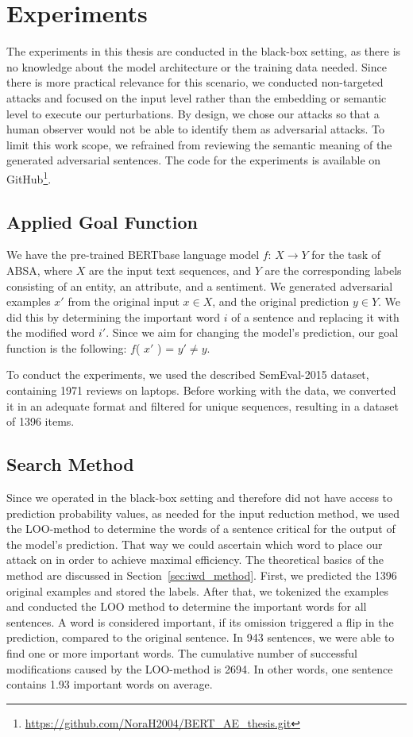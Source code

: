 \section{Experiments}
\label{sec:experiments}

The experiments in this thesis are conducted in the black-box setting, as there is no knowledge about the model architecture or the training data needed. Since there is more practical relevance for this scenario, we conducted non-targeted attacks and focused on the input level rather than the embedding or semantic level to execute our perturbations. By design, we chose our attacks so that a human observer would not be able to identify them as adversarial attacks. 
To limit this work scope, we refrained from reviewing the semantic meaning of the generated adversarial sentences. The code for the experiments is available on GitHub\footnote{\url{https://github.com/NoraH2004/BERT_AE_thesis.git}}.

\subsection{Applied Goal Function}
 \label{sec:goal_function_m}
We have the pre-trained BERTbase language model $f$: ${X \rightarrow Y}$ for the task of ABSA, where $X$ are the input text sequences, and $Y$ are the corresponding labels consisting of an entity, an attribute, and a sentiment. We generated adversarial examples ${x'}$ from the original input $x \in X$, and the original prediction $y \in Y$. We did this by determining the important word $i$ of a sentence and replacing it with the modified word $i'$. Since we aim for changing the model's prediction, our goal function is the following: 
$f$( $x'$ ) = $y' \neq y$.

To conduct the experiments, we used the described SemEval-2015 dataset, containing 1971 reviews on laptops. Before working with the data, we converted it in an adequate format and filtered for unique sequences, resulting in a dataset of 1396 items. 

\subsection{Search Method}
\label{sec:search_method_m}
Since we operated in the black-box setting and therefore did not have access to prediction probability values, as needed for the input reduction method, we used the LOO-method to determine the words of a sentence critical for the output of the model's prediction. That way we could ascertain which word to place our attack on in order to achieve maximal efficiency. The theoretical basics of the method are discussed in Section~\ref{sec:iwd_method}.
First, we predicted the 1396 original examples and stored the labels. After that, we tokenized the examples and conducted the LOO method to determine the important words for all sentences. A word is considered important, if its omission triggered a flip in the prediction, compared to the original sentence. 
In 943 sentences, we were able to find one or more important words. The cumulative number of successful modifications caused by the LOO-method is 2694. In other words, one sentence contains 1.93 important words on average.

